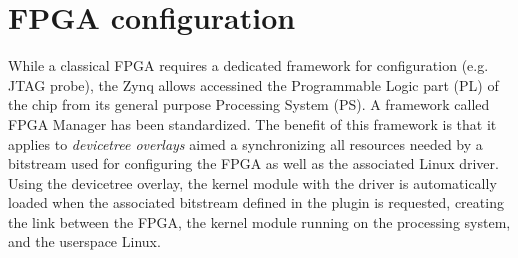 \documentclass{article}
\begin{document}
{{\section{FPGA configuration}

While a classical FPGA requires a dedicated framework for configuration (e.g. JTAG probe),
the Zynq allows accessined the Programmable Logic part (PL) of the chip from its general
purpose Processing System (PS). 
A framework called FPGA Manager has been 
standardized. The benefit of this framework is that it applies to {\em devicetree overlays}
aimed a synchronizing all resources needed by a bitstream used for configuring the FPGA
as well as the associated Linux driver. Using the devicetree overlay, the kernel module
with the driver is automatically loaded when the associated bitstream defined in the
plugin is requested, creating the link between the FPGA, the kernel module running on the processing
system, and the userspace Linux.

}}
\end{document}
